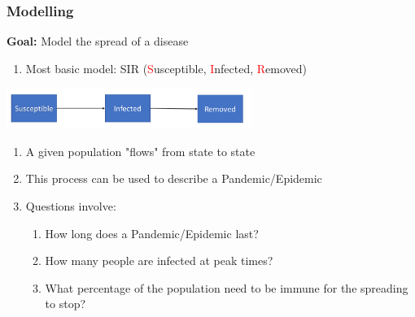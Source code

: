 \documentclass{beamer}
\begin{document}
\begin{frame}
	\frametitle{Modelling}
	\textbf{Goal:} Model the spread of a disease
	\begin{enumerate}[$\bullet$]
		\item Most basic model: SIR (\textcolor{red}{S}usceptible, \textcolor{red}{I}nfected, \textcolor{red}{R}emoved)\\
	\end{enumerate}
	
	\begin{center}
		\includegraphics[width=0.6\textwidth]{./images/SIRv2.png} %
	\end{center}
	\begin{enumerate}[$\bullet$]
		\item A given population "flows" from state to state
		\item This process can be used to describe a Pandemic/Epidemic 
		\item Questions involve:
			\begin{enumerate}[\textendash]
				\item How long does a Pandemic/Epidemic last?\\
				\item How many people are infected at peak times?\\
				\item What percentage of the population need to be immune for the spreading to stop?
			\end{enumerate}
	\end{enumerate}
\end{frame}
\end{document}
